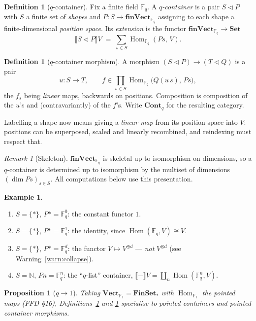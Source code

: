 \documentclass[11pt,a4paper]{article}
\newtheorem{proposition}[theorem]{Proposition}
\theoremstyle{definition}
\newtheorem{definition}[theorem]{Definition}
\newtheorem{example}[theorem]{Example}
\theoremstyle{remark}
\newtheorem{remark}[theorem]{Remark}
\newcommand{\FF}{\mathbb{F}}
\newcommand{\NN}{\mathbb{N}}
\newcommand{\cat}[1]{\mathbf{#1}}
\newcommand{\Set}{\cat{Set}}
\newcommand{\FinSet}{\cat{FinSet}}
\newcommand{\Vect}{\cat{Vect}}
\newcommand{\finVect}{\cat{finVect}}
\newcommand{\Cont}{\cat{Cont}}
\newcommand{\ext}[1]{\llbracket #1 \rrbracket}
\newcommand{\con}{\triangleleft}
\DeclareMathOperator{\Hom}{Hom}
\begin{document}
\begin{definition}[$q$-container]\label{def:qcont}
Fix a finite field $\FF_q$. A \emph{$q$-container} is a pair $S \con P$ with $S$ a
finite set of \emph{shapes} and $P : S \to \finVect_{\FF_q}$ assigning to each
shape a finite-dimensional \emph{position space}. Its \emph{extension} is the
functor $\finVect_{\FF_q} \to \Set$
\[
  \ext{S \con P} V \;=\; \sum_{s \in S} \Hom_{\FF_q}(P s,\, V).
\]
\end{definition}

\begin{definition}[$q$-container morphism]\label{def:qcontmor}
A morphism $(S \con P) \to (T \con Q)$ is a pair
\[
  u : S \to T, \qquad
  f \in \prod_{s \in S} \Hom_{\FF_q}\bigl(Q(u\,s),\, P s\bigr),
\]
the $f_s$ being \emph{linear} maps, backwards on positions. Composition is
composition of the $u$'s and (contravariantly) of the $f$'s. Write $\Cont_q$ for
the resulting category.
\end{definition}

Labelling a shape now means giving a \emph{linear map} from its position space
into $V$: positions can be superposed, scaled and linearly recombined, and
reindexing must respect that.

\begin{remark}[Skeleton]
$\finVect_{\FF_q}$ is skeletal up to isomorphism on dimensions, so a $q$-container
is determined up to isomorphism by the multiset of dimensions
$(\dim P s)_{s \in S}$. All computations below use this presentation.
\end{remark}

\begin{example}\label{ex:basic}
\begin{enumerate}[nosep,label=(\alph*)]
  \item $S = \{\ast\}$, $P\ast = \FF_q^{0}$: the constant functor $1$.
  \item $S = \{\ast\}$, $P\ast = \FF_q^{1}$: the identity, since
        $\Hom(\FF_q, V) \cong V$.
  \item $S = \{\ast\}$, $P\ast = \FF_q^{d}$: the functor $V \mapsto V^{\oplus d}$
        --- \emph{not} $V^{\otimes d}$ (see Warning~\ref{warn:collapse}).
  \item $S = \NN$, $P n = \FF_q^{n}$: the ``$q$-list'' container,
        $\ext{-}V = \coprod_n \Hom(\FF_q^n, V)$.
\end{enumerate}
\end{example}

\begin{proposition}[$q \to 1$]
Taking $\Vect_{\FF_1} = \FinSet_{\ast}$ with $\Hom_{\FF_1}$ the pointed maps
(FFD \S16), Definitions~\ref{def:qcont} and \ref{def:qcontmor} specialise to
pointed containers and pointed container morphisms.
\end{proposition}
\end{document}
